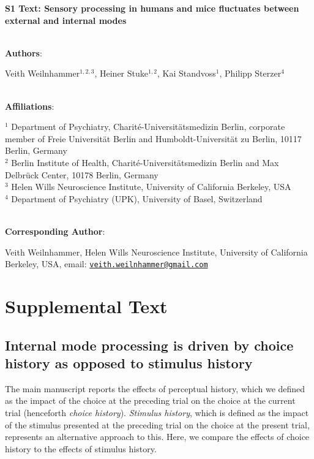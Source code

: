 \documentclass[
]{article}
\author{}
\date{\vspace{-2.5em}}
\begin{document}
\textbf{S1 Text: Sensory processing in humans and mice fluctuates between
external and internal modes}\\
\strut \\

\textbf{Authors}:

Veith Weilnhammer\(^{1,2, 3}\), Heiner Stuke\(^{1,2}\), Kai
Standvoss\(^{1}\), Philipp Sterzer\(^{4}\)\\
\strut \\
\textbf{Affiliations}:

\(^{1}\) Department of Psychiatry, Charité-Universitätsmedizin Berlin,
corporate member of Freie Universität Berlin and Humboldt-Universität zu
Berlin, 10117 Berlin, Germany\\
\(^{2}\) Berlin Institute of Health, Charité-Universitätsmedizin Berlin
and Max Delbrück Center, 10178 Berlin, Germany\\
\(^{3}\) Helen Wills Neuroscience Institute, University of California
Berkeley, USA\\
\(^{4}\) Department of Psychiatry (UPK), University of Basel,
Switzerland\\
\strut \\

\textbf{Corresponding Author}:

Veith Weilnhammer, Helen Wills Neuroscience Institute, University of
California Berkeley, USA, email:
\href{mailto:veith.weilnhammer@gmail.com}{\nolinkurl{veith.weilnhammer@gmail.com}}\\

\newpage

\hypertarget{supplemental-information}{%
\section{Supplemental Text}\label{supplemental-information}}

\hypertarget{internal-mode-processing-is-driven-by-choice-history-as-opposed-to-stimulus-history}{%
\subsection{Internal mode processing is driven by choice history as
opposed to stimulus
history}\label{internal-mode-processing-is-driven-by-choice-history-as-opposed-to-stimulus-history}}

The main manuscript reports the effects of perceptual history, which we
defined as the impact of the choice at the preceding trial on the choice
at the current trial (henceforth \emph{choice history}). \emph{Stimulus
history}, which is defined as the impact of the stimulus presented at
the preceding trial on the choice at the present trial, represents an
alternative approach to this. Here, we compare the effects of choice
history to the effects of stimulus history.
\end{document}
